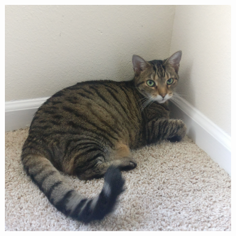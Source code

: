 \documentclass[9pt]{beamer}
\begin{document}
\begin{frame}
\begin{columns}
\begin{column}{2.5cm}
\begin{figure}
		\end{figure}
	\end{column}
	\begin{column}{4cm}
		\begin{figure}
			\includegraphics[scale=0.05]{boba.jpg}
		\end{figure}
	\end{column}
\end{columns} 
\end{frame}
\end{document}
